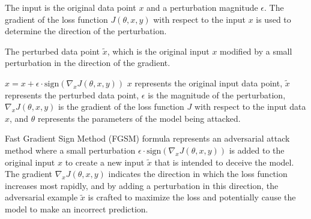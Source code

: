 
The input is the original data point \(x\) and a perturbation magnitude \(\epsilon\). The gradient of the loss function \(J(\theta, x, y)\) with respect to the input \(x\) is used to determine the direction of the perturbation.

The perturbed data point \(\tilde{x}\), which is the original input \(x\) modified by a small perturbation in the direction of the gradient.

${x} = x + \epsilon \cdot \text{sign}(\nabla_x J(\theta, x, y))$
$x$ represents the original input data point,
$\tilde{x}$ represents the perturbed data point,
$\epsilon$ is the magnitude of the perturbation,
$\nabla_x J(\theta, x, y)$ is the gradient of the loss function $J$ with respect to the input data $x$, and
$\theta$ represents the parameters of the model being attacked.

Fast Gradient Sign Method (FGSM) formula represents an adversarial attack method where a small perturbation \(\epsilon \cdot \text{sign}(\nabla_x J(\theta, x, y))\) is added to the original input \(x\) to create a new input \(\tilde{x}\) that is intended to deceive the model. The gradient \(\nabla_x J(\theta, x, y)\) indicates the direction in which the loss function increases most rapidly, and by adding a perturbation in this direction, the adversarial example \(\tilde{x}\) is crafted to maximize the loss and potentially cause the model to make an incorrect prediction.